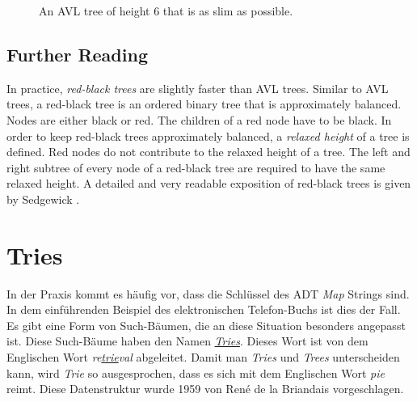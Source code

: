 \begin{figure}[!ht]
  \centering
  \caption{An AVL tree of height 6 that is as slim as possible.}
  \label{fig:avl-worst-case}
\end{figure}

\subsection{Further Reading}
In practice, \emph{red-black trees} are slightly faster than \textsc{AVL} trees.  Similar to
\textsc{AVL} trees, a  red-black tree
  is an ordered binary tree that is approximately balanced.  Nodes are either black or red.
The children of a red node have to be black.  In order to keep red-black trees approximately
balanced, a \emph{relaxed height} of a tree is defined.  Red nodes do not contribute to the relaxed
height of a tree.  The left and right subtree of every node of a red-black tree are required to have the same 
relaxed height.  A detailed and very readable exposition of red-black trees is given by Sedgewick
\cite{sedgewick:2011}. 



\section{Tries}
In der Praxis kommt es h\"aufig vor, dass die Schl\"ussel des ADT \textsl{Map} Strings sind.
In dem einf\"uhrenden Beispiel des elektronischen Telefon-Buchs ist dies der Fall.  Es gibt eine
Form von Such-B\"aumen, die an diese Situation besonders angepasst ist.  Diese Such-B\"aume
haben den Namen \href{https://en.wikipedia.org/?title=Trie}{\emph{Tries}}.  Dieses Wort ist von dem
Englischen Wort  
\emph{re\underline{trie}val} abgeleitet. Damit man \emph{Tries} und \emph{Trees}
unterscheiden kann, wird \emph{Trie} so ausgesprochen, dass es sich mit dem Englischen
Wort \emph{pie} reimt.  Diese Datenstruktur wurde 1959 von Ren\'e de la Briandais
\cite{briandais:59} vorgeschlagen.


